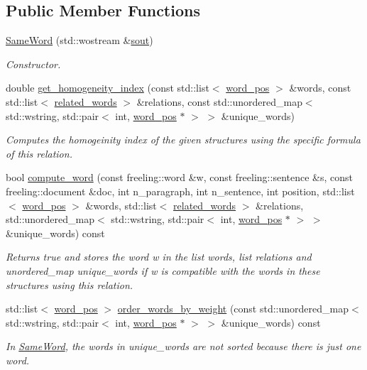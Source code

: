 \subsection*{Public Member Functions}
\begin{DoxyCompactItemize}
\item 
\hyperlink{classSameWord_ac0dd07d610c7e8493ddaaf17c00db078}{Same\+Word} (std\+::wostream \&\hyperlink{classRelation_a44deec0ee05d803ea23e14520fd57a75}{sout})
\begin{DoxyCompactList}\small\item\em Constructor. \end{DoxyCompactList}\item 
double \hyperlink{classSameWord_a3c0506fe869c16d2c7d20d5647a6c99f}{get\+\_\+homogeneity\+\_\+index} (const std\+::list$<$ \hyperlink{structword__pos}{word\+\_\+pos} $>$ \&words, const std\+::list$<$ \hyperlink{structrelated__words}{related\+\_\+words} $>$ \&relations, const std\+::unordered\+\_\+map$<$ std\+::wstring, std\+::pair$<$ int, \hyperlink{structword__pos}{word\+\_\+pos} $\ast$ $>$ $>$ \&unique\+\_\+words)
\begin{DoxyCompactList}\small\item\em Computes the homogeinity index of the given structures using the specific formula of this relation. \end{DoxyCompactList}\item 
bool \hyperlink{classSameWord_a3773253aec894b3a50c5d03e5725f4bf}{compute\+\_\+word} (const freeling\+::word \&w, const freeling\+::sentence \&s, const freeling\+::document \&doc, int n\+\_\+paragraph, int n\+\_\+sentence, int position, std\+::list$<$ \hyperlink{structword__pos}{word\+\_\+pos} $>$ \&words, std\+::list$<$ \hyperlink{structrelated__words}{related\+\_\+words} $>$ \&relations, std\+::unordered\+\_\+map$<$ std\+::wstring, std\+::pair$<$ int, \hyperlink{structword__pos}{word\+\_\+pos} $\ast$ $>$ $>$ \&unique\+\_\+words) const 
\begin{DoxyCompactList}\small\item\em Returns true and stores the word w in the list words, list relations and unordered\+\_\+map unique\+\_\+words if w is compatible with the words in these structures using this relation. \end{DoxyCompactList}\item 
std\+::list$<$ \hyperlink{structword__pos}{word\+\_\+pos} $>$ \hyperlink{classSameWord_a633fbd80c1abe38b71af82cc3fb3e528}{order\+\_\+words\+\_\+by\+\_\+weight} (const std\+::unordered\+\_\+map$<$ std\+::wstring, std\+::pair$<$ int, \hyperlink{structword__pos}{word\+\_\+pos} $\ast$ $>$ $>$ \&unique\+\_\+words) const 
\begin{DoxyCompactList}\small\item\em In \hyperlink{classSameWord}{Same\+Word}, the words in unique\+\_\+words are not sorted because there is just one word. \end{DoxyCompactList}\end{DoxyCompactItemize}
